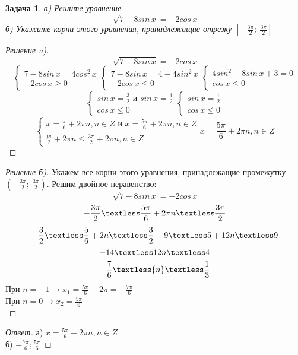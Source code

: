 \documentclass[a4paper,12pt]{article}
\newtheorem{problem}{Задача}
\begin{document}
\begin{problem}
а) Решите уравнение
$$\sqrt{7-8sin\,x}=-2cos\,x$$
б) Укажите корни этого уравнения, принадлежащие отрезку $\left[-\frac{3\pi}{2};\ \frac{3\pi}{2}\right]$
\end{problem}
\newpage
\begin{proof}[Решение a)]
$$\sqrt{7-8sin\,x}=-2cos\,x$$
\begin{equation*}
	\begin{cases}
		7-8sin\,x=4cos^2\,x\\
		-2cos\,x\ge0
	\end{cases}
	\begin{cases}
		7-8sin\,x=4-4sin^2\,x\\
		-2cos\,x\le0
	\end{cases}	
	\begin{cases}
		4sin^2-8sin\,x+3=0\\
		cos\,x\le0
	\end{cases}		
\end{equation*}
\begin{equation*}
	\begin{cases}
		sin\,x=\frac{3}{2}\text{ и }sin\,x=\frac{1}{2}\\
		cos\,x\le0
	\end{cases}	
	\begin{cases}
		sin\,x=\frac{1}{2}\\
		cos\,x\le0
	\end{cases}	
\end{equation*}
\begin{equation*}
	\begin{cases}
		x=\frac{\pi}{6}+2\pi{}n, n\in{}Z\text{ и }x=\frac{5\pi}{6}+2\pi{}n, n\in{}Z\\
		\frac{pi}{2}+2\pi{}n\le\frac{3\pi}{2}+2\pi{}n, n\in{}Z
	\end{cases}	
	x=\frac{5\pi}{6}+2\pi{}n,n\in{}Z
\end{equation*}
\end{proof}
\begin{proof}[Решение б)]
Укажем все корни этого уравнения, принадлежащие промежутку $\left(-\frac{3\pi}{2};\ \frac{3\pi}{2}\right)$. Решим двойное неравенство:
$$\sqrt{7-8sin\,x}=-2cos\,x$$
$$
-\frac{3\pi}{2}\textless \frac{5\pi}{6} + 2\pi{}n\textless \frac{3\pi}{2}$$$$
-\frac{3}{2}\textless \frac{5}{6} + 2{}n\textless \frac{3}{2}\\
-9\textless5+12n\textless9$$$$
-14\textless12n\textless4$$$$
-\frac{7}{6}\textless{n}\textless\frac{1}{3}$$
При $n=-1 \rightarrow x_1=\frac{5\pi}{6}-2\pi=-\frac{7\pi}{6}$\\
При $n=0 \rightarrow x_2=\frac{5\pi}{6}$\\
\end{proof}
\begin{proof}[Ответ]
а)	$x=\frac{5\pi}{6}+2\pi{}n,n\in{}Z$\\ б)	$-\frac{7\pi}{6}; \frac{5\pi}{6}$
\end{proof}
\end{document}
